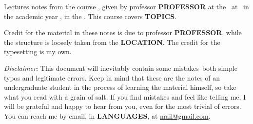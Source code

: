 Lectures notes from the course \MyTitle, given by professor \textbf{PROFESSOR} at the \faculty~at \location~in the academic year \academicyear, in the \term. This course covers \textbf{TOPICS}.

Credit for the material in these notes is due to professor \textbf{PROFESSOR}, while the structure is loosely taken from the \textbf{LOCATION}. The credit for the typesetting is my own.

\textit{Disclaimer:} This document will inevitably contain some mistakes--both simple typos and legitimate errors. Keep in mind that these are the notes of an undergraduate student in the process of learning the material himself, so take what you read with a grain of salt. If you find mistakes and feel like telling me, I will be grateful and happy to hear from you, even for the most trivial of errors. You can reach me by email, in \textbf{LANGUAGES}, at \href{mailto:mail@gmail.com}{mail@gmail.com}.
